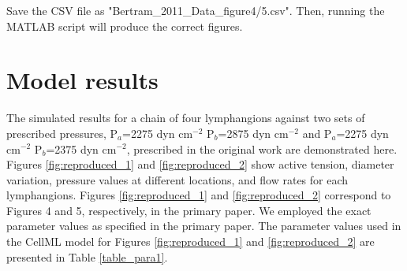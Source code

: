 \documentclass[fleqn,10pt]{physiome}
\begin{document}
Save the CSV file as "Bertram\_2011\_Data\_figure4/5.csv". Then, running the MATLAB script will produce the correct figures.



\section{Model results}

The simulated results for a chain of four lymphangions against two sets of prescribed pressures, P$_{a}$=2275 dyn cm$^{-2}$ P$_{b}$=2875 dyn cm$^{-2}$ and P$_{a}$=2275 dyn cm$^{-2}$ P$_{b}$=2375 dyn cm$^{-2}$, prescribed in the original work are demonstrated here. Figures \ref{fig:reproduced_1} and  \ref{fig:reproduced_2} show active tension, diameter variation, pressure values at different locations, and flow rates for each lymphangions. 
Figures \ref{fig:reproduced_1} and \ref{fig:reproduced_2} correspond to Figures 4 and 5, respectively, in the primary paper. We employed the exact parameter values as specified in the primary paper. The parameter values used in the CellML model for Figures \ref{fig:reproduced_1} and \ref{fig:reproduced_2} are presented in Table \ref{table_para1}.
\end{document}
